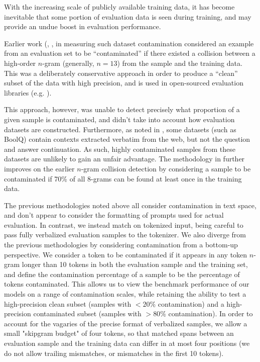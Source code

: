 With the increasing scale of publicly available training data, it has become inevitable that some portion of evaluation data is seen during training, and may provide an undue boost in evaluation performance.

Earlier work (\cite{gpt3}, \cite{flan}, \cite{glam} in measuring such dataset contamination considered an example from an evaluation set to be ``contaminated'' if there existed a collision between a high-order $n$-gram (generally, $n=13$) from the sample and the training data. This was a deliberately conservative approach in order to produce a ``clean'' subset of the data with high precision, and is used in open-sourced evaluation libraries (e.g. \cite{llm-eval-harness}).

This approach, however, was unable to detect precisely what proportion of a given sample is contaminated, and didn't take into account how evaluation datasets are constructed. Furthermore, as noted in \cite{palm1}, some datasets (such as BoolQ) contain contexts extracted verbatim from the web, but not the question and answer continuation. As such, highly contaminated samples from these datasets are unlikely to gain an unfair advantage.  The methodology in \cite{palm1} further improves on the earlier $n$-gram collision detection by considering a sample to be contaminated if 70\% of all 8-grams can be found at least once in the training data.

The previous methodologies noted above all consider contamination in text space, and don't appear to consider the formatting of prompts used for actual evaluation. In contrast, we instead match on tokenized input, being careful to pass fully verbalized evaluation samples to the tokenizer.  We also diverge from the previous methodologies by considering contamination from a bottom-up perspective. We consider a token to be contaminated if it appears in any token $n$-gram longer than 10 tokens in both the evaluation sample and the training set, and define the contamination percentage of a sample to be the percentage of tokens contaminated. This allows us to view the benchmark performance of our models on a range of contamination scales, while retaining the ability to test a high-precision clean subset (samples with $< 20\%$ contamination) and a high-precision contaminated subset (samples with $> 80\%$ contamination).  In order to account for the vagaries of the precise format of verbalized samples, we allow a small "skipgram budget" of four tokens, so that matched spans between an evaluation sample and the training data can differ in at most four positions (we do not allow trailing mismatches, or mismatches in the first 10 tokens).

